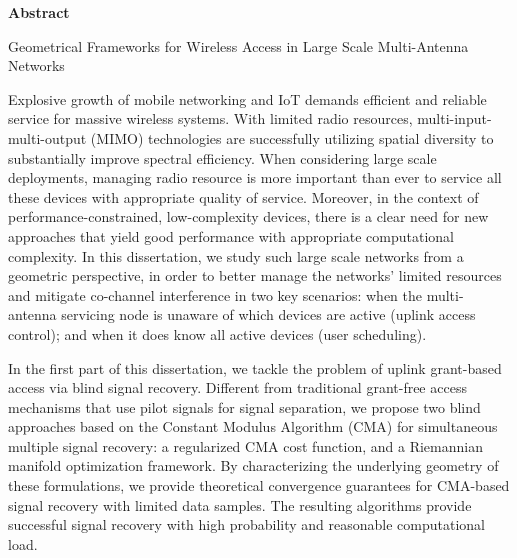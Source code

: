 \newpage
{\baselineskip 14pt 
}
\vspace{10pt}
\centerline{\Huge \bf {Abstract}} 
\vspace{5pt}

\begin{center}
Geometrical Frameworks for Wireless Access in Large Scale Multi-Antenna Networks\\
\end{center}
\vspace{18pt}

Explosive growth of mobile networking and IoT demands efficient and reliable service for massive wireless systems. With limited radio resources, multi-input-multi-output (MIMO) technologies are successfully utilizing spatial diversity to substantially improve spectral efficiency.  
When considering large scale deployments, managing radio resource is more important than ever to service all these devices with appropriate quality of service. Moreover, in the context of performance-constrained, low-complexity devices, there is a clear need for new approaches that yield good performance with appropriate computational complexity.
In this dissertation, we study such large scale networks from a geometric perspective, in order to
better manage the networks' limited resources and mitigate co-channel interference in two key scenarios: when the multi-antenna servicing node is unaware of which devices are active (uplink access control); and when it does know all active devices (user scheduling). 

In the first part of this dissertation, we tackle the problem of uplink grant-based access via blind signal recovery. 
Different from traditional grant-free access mechanisms that use pilot signals for signal separation, we propose two blind approaches based on the Constant Modulus Algorithm (CMA) for simultaneous multiple signal recovery: a regularized CMA cost function, and a Riemannian manifold optimization framework. By characterizing the underlying geometry of these formulations, we provide theoretical convergence guarantees for CMA-based signal recovery with limited data samples. The resulting algorithms provide successful signal recovery with high probability and reasonable computational load.

